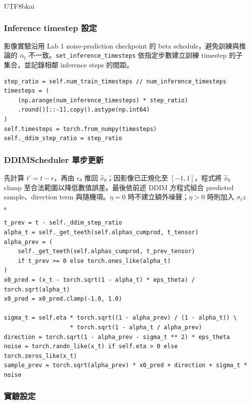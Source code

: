 \documentclass[11pt,a4paper]{article}
\newcommand{\code}[1]{\texttt{#1}}
\begin{document}
\begin{CJK*}{UTF8}{bkai}
\subsubsection{Inference timestep 設定}

影像實驗沿用 Lab 1 noise-prediction checkpoint 的 beta schedule，避免訓練與推論的 $\bar{\alpha}_t$ 不一致。\code{set\_inference\_timesteps} 依指定步數建立訓練 timestep 的子集合，並記錄相鄰 inference steps 的間距。

\begin{lstlisting}[caption={\code{DDIMScheduler.set\_inference\_timesteps}}]
step_ratio = self.num_train_timesteps // num_inference_timesteps
timesteps = (
    (np.arange(num_inference_timesteps) * step_ratio)
    .round()[::-1].copy().astype(np.int64)
)
self.timesteps = torch.from_numpy(timesteps)
self._ddim_step_ratio = step_ratio
\end{lstlisting}

\subsubsection{DDIMScheduler 單步更新}

先計算 $t'=t-r$，再由 $\epsilon_\theta$ 推回 $\hat{x}_0$；因影像已正規化至 $[-1,1]$，程式將 $\hat{x}_0$ clamp 至合法範圍以降低數值誤差。最後依前述 DDIM 方程式組合 predicted sample、direction term 與隨機項。$\eta=0$ 時不建立額外噪聲；$\eta>0$ 時則加入 $\sigma_tz$。

\begin{lstlisting}[caption={\code{DDIMScheduler.step}}]
t_prev = t - self._ddim_step_ratio
alpha_t = self._get_teeth(self.alphas_cumprod, t_tensor)
alpha_prev = (
    self._get_teeth(self.alphas_cumprod, t_prev_tensor)
    if t_prev >= 0 else torch.ones_like(alpha_t)
)
x0_pred = (x_t - torch.sqrt(1 - alpha_t) * eps_theta) / torch.sqrt(alpha_t)
x0_pred = x0_pred.clamp(-1.0, 1.0)

sigma_t = self.eta * torch.sqrt((1 - alpha_prev) / (1 - alpha_t)) \
                   * torch.sqrt(1 - alpha_t / alpha_prev)
direction = torch.sqrt(1 - alpha_prev - sigma_t ** 2) * eps_theta
noise = torch.randn_like(x_t) if self.eta > 0 else torch.zeros_like(x_t)
sample_prev = torch.sqrt(alpha_prev) * x0_pred + direction + sigma_t * noise
\end{lstlisting}

\subsubsection{實驗設定}


\end{CJK*}
\end{document}
